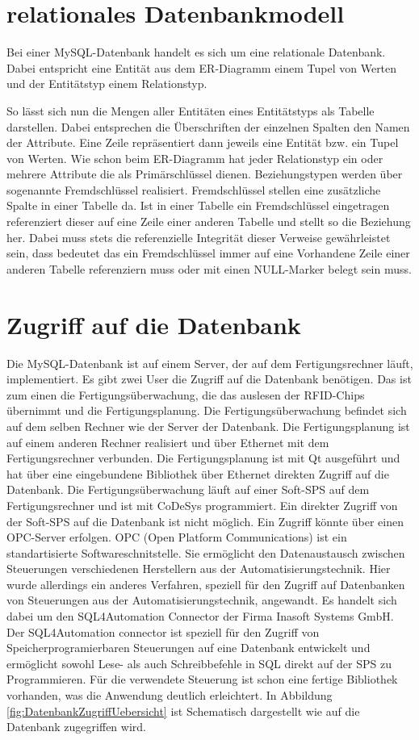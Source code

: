 \section{relationales Datenbankmodell}\label{kap:relationales_Datenbankmodell}
Bei einer MySQL-Datenbank handelt es sich um eine relationale Datenbank. Dabei entspricht eine Entität aus dem ER-Diagramm einem Tupel von Werten und der Entitätstyp einem Relationstyp. 

So lässt sich nun die Mengen aller Entitäten eines Entitätstyps als Tabelle darstellen. Dabei entsprechen die Überschriften der einzelnen Spalten den Namen der Attribute. Eine Zeile repräsentiert dann jeweils eine Entität bzw. ein Tupel von Werten. Wie schon beim ER-Diagramm hat jeder Relationstyp ein oder mehrere Attribute die als Primärschlüssel dienen. Beziehungstypen werden über sogenannte Fremdschlüssel realisiert. Fremdschlüssel stellen eine zusätzliche Spalte in einer Tabelle da. Ist in einer Tabelle ein Fremdschlüssel eingetragen referenziert dieser auf eine  Zeile einer anderen Tabelle und stellt so die Beziehung her. Dabei muss stets die referenzielle Integrität dieser Verweise gewährleistet sein, dass bedeutet das ein Fremdschlüssel immer auf eine Vorhandene Zeile einer anderen Tabelle referenziern muss oder mit einen NULL-Marker belegt sein muss. 

\section{Zugriff auf die Datenbank}\label{kap:DatenbankZugriff}
Die MySQL-Datenbank ist auf einem Server, der auf dem Fertigungsrechner läuft, implementiert. Es gibt zwei User die Zugriff auf die Datenbank benötigen. Das ist zum einen die Fertigungsüberwachung, die das auslesen der RFID-Chips übernimmt und die Fertigungsplanung. Die Fertigungsüberwachung befindet sich auf dem selben Rechner wie der Server der Datenbank. Die Fertigungsplanung ist auf einem anderen Rechner realisiert und über Ethernet mit dem Fertigungsrechner verbunden. Die Fertigungsplanung ist mit Qt ausgeführt und hat über eine eingebundene Bibliothek über Ethernet direkten Zugriff auf die Datenbank. Die Fertigungsüberwachung läuft auf einer Soft-SPS auf dem Fertigungsrechner und ist mit CoDeSys programmiert. Ein direkter Zugriff von der Soft-SPS auf die Datenbank ist nicht möglich. Ein Zugriff könnte über einen OPC-Server erfolgen. OPC (Open Platform Communications) ist ein standartisierte Softwareschnitstelle. Sie ermöglicht den Datenaustausch zwischen Steuerungen verschiedenen Herstellern aus der Automatisierungstechnik. Hier wurde allerdings ein anderes Verfahren, speziell für den Zugriff auf Datenbanken von Steuerungen aus der Automatisierungstechnik, angewandt. Es handelt sich dabei um den SQL4Automation Connector der Firma Inasoft Systems GmbH. Der SQL4Automation connector ist speziell für den Zugriff von Speicherprogramierbaren Steuerungen auf eine Datenbank entwickelt und ermöglicht sowohl Lese- als auch Schreibbefehle in SQL direkt auf der SPS zu Programmieren. Für die verwendete Steuerung ist schon eine fertige Bibliothek vorhanden, was die Anwendung deutlich erleichtert. In Abbildung \ref{fig:DatenbankZugriffUebersicht} ist Schematisch dargestellt wie auf die Datenbank zugegriffen wird.

